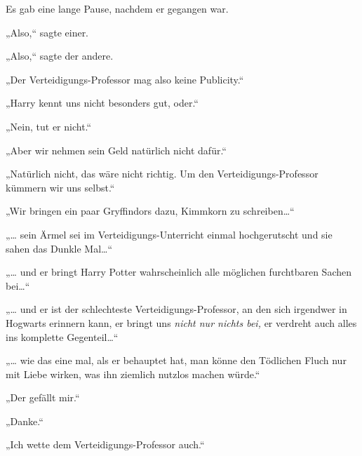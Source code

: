Es gab eine lange Pause, nachdem er gegangen war.

„Also,“ sagte einer.

„Also,“ sagte der andere.

„Der Verteidigungs-Professor mag also keine Publicity.“

„Harry kennt uns nicht besonders gut, oder.“

„Nein, tut er nicht.“

„Aber wir nehmen sein Geld natürlich nicht dafür.“

„Natürlich nicht, das wäre nicht richtig. Um den Verteidigungs-Professor kümmern wir uns selbst.“

„Wir bringen ein paar Gryffindors dazu, Kimmkorn zu schreiben…“

„… sein Ärmel sei im Verteidigungs-Unterricht einmal hochgerutscht und sie sahen das Dunkle Mal…“

„… und er bringt Harry Potter wahrscheinlich alle möglichen furchtbaren Sachen bei…“

„… und er ist der schlechteste Verteidigungs-Professor, an den sich irgendwer in Hogwarts erinnern kann, er bringt uns \emph{nicht nur nichts bei,} er verdreht auch alles ins komplette Gegenteil…“

„… wie das eine mal, als er behauptet hat, man könne den Tödlichen Fluch nur mit Liebe wirken, was ihn ziemlich nutzlos machen würde.“

„Der gefällt mir.“

„Danke.“

„Ich wette dem Verteidigungs-Professor auch.“

